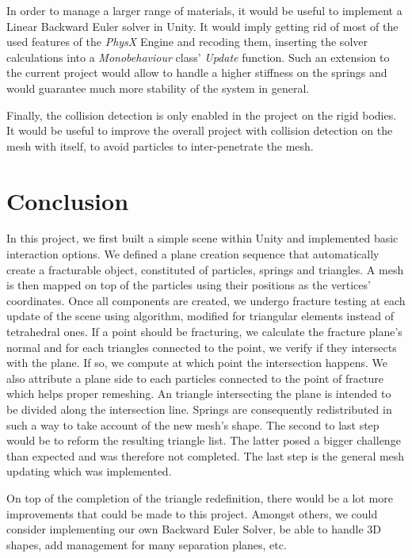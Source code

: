 \documentclass[tog]{acmsiggraph}
\begin{document}
In order to manage a larger range of materials, it would be useful to implement a Linear Backward Euler solver in Unity. It would imply getting rid of most of the used features of the \textit{PhysX} Engine and recoding them, inserting the solver calculations into a \textit{Monobehaviour} class' \textit{Update} function. Such an extension to the current project would allow to handle a higher stiffness on the springs and would guarantee much more stability of the system in general. 

Finally, the collision detection is only enabled in the project on the rigid bodies. It would be useful to improve the overall project with collision detection on the mesh with itself, to avoid particles to inter-penetrate the mesh. 

\section{Conclusion}

In this project, we first built a simple scene within Unity and implemented basic interaction options. We defined a plane creation sequence that automatically create a fracturable object, constituted of particles, springs and triangles. A mesh is then mapped on top of the particles using their positions as the vertices' coordinates. Once all components are created, we undergo fracture testing at each update of the scene using \cite{Obrien:1999:GMA} algorithm, modified for triangular elements instead of tetrahedral ones. If a point should be fracturing, we calculate the fracture plane's normal and for each triangles connected to the point, we verify if they intersects with the plane. If so, we compute at which point the intersection happens. We also attribute a plane side to each particles connected to the point of fracture which helps proper remeshing. An triangle intersecting the plane is intended to be divided along the intersection line. Springs are consequently redistributed in such a way to take account of the new mesh's shape. The second to last step would be to reform the resulting triangle list. The latter posed a bigger challenge than expected and was therefore not completed. The last step is the general mesh updating which was implemented. 

On top of the completion of the triangle redefinition, there would be a lot more improvements that could be made to this project. Amongst others, we could consider implementing our own Backward Euler Solver, be able to handle 3D shapes, add management for many separation planes, etc.  
\end{document}
